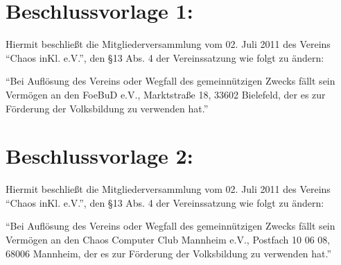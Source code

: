 \documentclass[a4paper, 12pt]{scrartcl}
\begin{document}
	\section*{Beschlussvorlage 1:}

	Hiermit beschließt die Mitgliederversammlung vom 02. Juli 2011 des Vereins ``Chaos inKl. e.V.'',
	den §13 Abs. 4 der Vereinssatzung wie folgt zu ändern:

	\hspace{1pt}

	``Bei Auflösung des Vereins oder Wegfall des gemeinnützigen Zwecks fällt sein
	Vermögen an den FoeBuD e.V., Marktstraße 18, 33602 Bielefeld, der es zur Förderung
	der Volksbildung zu verwenden hat.''

	\section*{Beschlussvorlage 2:}

	Hiermit beschließt die Mitgliederversammlung vom 02. Juli 2011 des Vereins ``Chaos inKl. e.V.'',
	den §13 Abs. 4 der Vereinssatzung wie folgt zu ändern:

	\hspace{1pt}

	``Bei Auflösung des Vereins oder Wegfall des gemeinnützigen Zwecks fällt sein
	Vermögen an den Chaos Computer Club Mannheim e.V., Postfach 10 06 08, 68006 Mannheim, der es zur Förderung
	der Volksbildung zu verwenden hat.''
\end{document}
